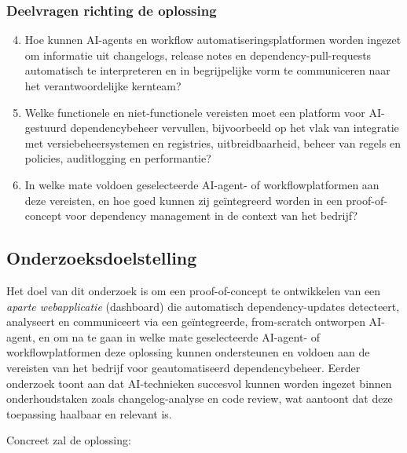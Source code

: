 \subsubsection{Deelvragen richting de oplossing}
\label{sec:Deelvragen_richting_de_oplossing}

\begin{enumerate}
  \setcounter{enumi}{3}
  \item Hoe kunnen AI-agents en workflow automatiseringsplatformen worden ingezet om informatie uit changelogs, release notes en dependency-pull-requests automatisch te interpreteren en in begrijpelijke vorm te communiceren naar het verantwoordelijke kernteam?
  \item Welke functionele en niet-functionele vereisten moet een platform voor AI-gestuurd dependencybeheer vervullen, bijvoorbeeld op het vlak van integratie met versiebeheersystemen en registries, uitbreidbaarheid, beheer van regels en policies, auditlogging en performantie?
  \item In welke mate voldoen geselecteerde AI-agent- of workflowplatformen aan deze vereisten, en hoe goed kunnen zij geïntegreerd worden in een proof-of-concept voor dependency management in de context van het bedrijf?
\end{enumerate}

\subsection{Onderzoeksdoelstelling}
\label{sec:Onderzoeksdoelstelling}

Het doel van dit onderzoek is om een proof-of-concept te ontwikkelen van een \emph{aparte webapplicatie} (dashboard) die automatisch dependency-updates detecteert, analyseert en communiceert via een geïntegreerde, from-scratch ontworpen AI-agent, en om na te gaan in welke mate geselecteerde AI-agent- of workflowplatformen deze oplossing kunnen ondersteunen en voldoen aan de vereisten van het bedrijf voor geautomatiseerd dependencybeheer. Eerder onderzoek toont aan dat AI-technieken succesvol kunnen worden ingezet binnen onderhoudstaken zoals changelog-analyse en code review, wat aantoont dat deze toepassing haalbaar en relevant is.\parencite{Behutiye2024,Joshi2025,Kim2024,Zhu2025}

Concreet zal de oplossing:

